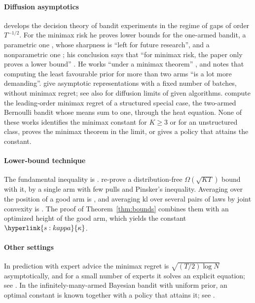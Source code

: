 \documentclass[11pt]{article}
\DeclareRobustCommand{\sy}[2]{{\hyperlink{#1}{#2}}}
\newcommand{\1}{\mathbf{1}}
\newcommand{\kl}{\mathrm{kl}}
\newcommand{\kap}{\sy{s:kappa}{\kappa}}
\begin{document}
\paragraph{Diffusion asymptotics} \citet{Adu25} develops the decision theory of bandit experiments in the regime of gaps of order $T^{-1/2}$. For the
minimax risk he proves lower bounds for the one-armed bandit, a parametric one \citep[Section~5.4, (5.8)]{Adu25}, whose sharpness is ``left for future
research'', and a nonparametric one \citep[Section~6, (6.2)]{Adu25}; his conclusion says that ``for minimax risk, the paper only proves a lower bound''
\citep[Section~7]{Adu25}. He works ``under a minimax theorem'' \citep[Section~2.4]{Adu25}, and notes that computing the least favourable prior for more than
two arms ``is a lot more demanding''. \citet[Theorem~2]{HP23} give asymptotic representations with a fixed number of batches, without minimax regret; see
also \citet{FG21,KW24,KZ21} for diffusion limits of given algorithms. \citet[Corollary~3.5]{KK23} compute the leading-order minimax regret of a
structured special case, the two-armed Bernoulli bandit whose means sum to one, through the heat equation. None of these works identifies the minimax
constant for $K\ge3$ or for an unstructured class, proves the minimax theorem in the limit, or gives a policy that attains the constant.

\paragraph{Lower-bound technique} The fundamental inequality is \citet[(6)]{GMS19}. \citet[Appendix~B.1]{GMS19} re-prove a distribution-free
$\Omega(\sqrt{KT})$ bound with it, by a single arm with few pulls and Pinsker's inequality. Averaging over the position of a good arm is
\citet[Exercise~15.2]{LS}, and averaging $\kl$ over several pairs of laws by joint convexity is \citet[Section~3, (4)--(5), with Corollary~3]{GMS20}. The
proof of Theorem~\ref{thm:bounds} combines them with an optimized height of the good arm, which yields the constant $\kap$.

\paragraph{Other settings} In prediction with expert advice the minimax regret is $\sqrt{(T/2)\log N}$ asymptotically, and for a small number of experts it
solves an explicit equation; see \citet{CB97,Cov66,GPS16,BEZ20}. In the infinitely-many-armed Bayesian bandit with uniform prior, an optimal constant is
known together with a policy that attains it; see \citet{BCZ97,BP13}.
\end{document}
